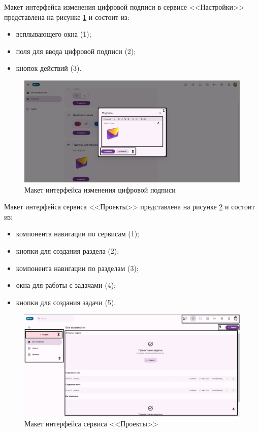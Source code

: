 Макет интерфейса изменения цифровой подписи в сервисе <<Настройки>> представлена на рисунке \ref{templ:image6b} и состоит из:
\begin{itemize}
  \item всплывающего окна (1);
  \item поля для ввода цифровой подписи (2);
  \item кнопок действий (3).
\end{itemize}
\begin{figure}[H]
	\centering
	\includegraphics[width=1\linewidth]{images/настройки2}
	\caption{Макет интерфейса изменения цифровой подписи}
	\label{templ:image6b}
\end{figure}

Макет интерфейса сервиса <<Проекты>> представлена на рисунке \ref{templ:image7} и состоит из:
\begin{itemize}
  \item компонента навигации по сервисам (1);
  \item кнопки для создания раздела (2);
  \item компонента навигации по разделам (3);
  \item окна для работы с задачами (4);
  \item кнопки для создания задачи (5).
\end{itemize}
\begin{figure}[H]
	\centering
	\includegraphics[width=1\linewidth]{images/проекты}
	\caption{Макет интерфейса сервиса <<Проекты>>}
	\label{templ:image7}
\end{figure}

